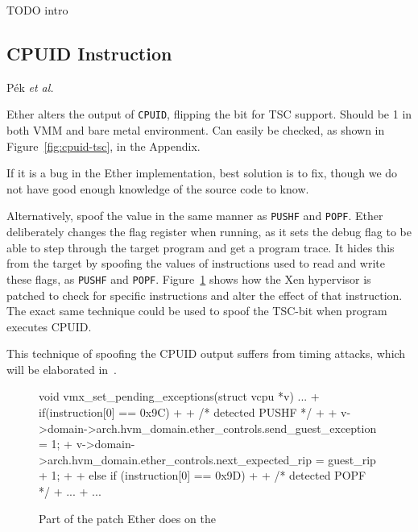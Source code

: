 TODO intro


\subsection{CPUID Instruction}
\label{sec:approach-cpuid}


P{\'e}k {\em et al.}~\cite{nether}

Ether alters the output of {\tt CPUID}, flipping the bit for TSC support. Should
be 1 in both VMM and bare metal environment. Can easily be checked, as shown in
Figure~\ref{fig:cpuid-tsc}, in the Appendix.

If it is a bug in the Ether implementation, best solution is to fix, though we
do not have good enough knowledge of the source code to know.

Alternatively, spoof the value in the same manner as {\tt PUSHF} and {\tt POPF}.
Ether deliberately changes the flag register when running, as it sets the debug
flag to be able to step through the target program and get a program trace. It
hides this from the target by spoofing the values of instructions used to read
and write these flags, as {\tt PUSHF} and {\tt POPF}. Figure~\ref{fig:pushf}
shows how the Xen hypervisor is patched to check for specific instructions and
alter the effect of that instruction. The exact same technique could be used to
spoof the TSC-bit when program executes CPUID.

This technique of spoofing the CPUID output suffers from timing attacks, which
will be elaborated in~.

\begin{figure}
\begin{lstc}
void vmx_set_pending_exceptions(struct vcpu *v)
{
    ...
+    if(instruction[0] == 0x9C)
+    {
+         /* detected PUSHF */
+
+         v->domain->arch.hvm_domain.ether_controls.send_guest_exception = 1;
+         v->domain->arch.hvm_domain.ether_controls.next_expected_rip = guest_rip + 1;
+    }
+    else if (instruction[0] == 0x9D)
+    {
+         /* detected POPF */
+         ...
+    }
    ...
}
\end{lstc}
\caption{\label{fig:pushf} Part of the patch Ether does on the }
\end{figure}

